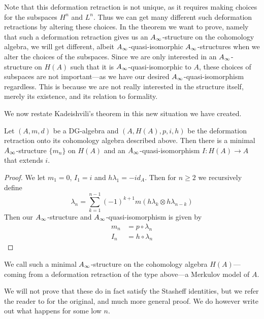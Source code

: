 Note that this deformation retraction is not unique, as it requires making choices for the subspaces $H^n$ and $L^n$. Thus we can get many different such deformation retractions by altering these choices. In the theorem we want to prove, namely that such a deformation retraction gives us an $A_{\infty}$-structure on the cohomology algebra, we will get different, albeit $A_{\infty}$-quasi-isomorphic $A_{\infty}$-structures when we alter the choices of the subspaces. Since we are only interested in an $A_{\infty}$-structure on $H(A)$ such that it is $A_{\infty}$-quasi-isomorphic to $A$, these choices of subspaces are not important---as we have our desired $A_{\infty}$-quasi-isomorphism regardless. This is because we are not really interested in the structure itself, merely its existence, and its relation to formality. 

We now restate Kadeishvili's theorem in this new situation we have created.

\begin{theorem}
\label{thm:Kadeishvilis_theorem2}
Let $(A, m, d)$ be a DG-algebra and $(A, H(A), p, i, h)$ be the deformation retraction onto its cohomology algebra described above. Then there is a minimal $A_{\infty}$-structure $\{m_n\}$ on $H(A)$ and an $A_{\infty}$-quasi-isomorphism $I\colon H(A)\longrightarrow A$ that extends $i$. 
\end{theorem}
\begin{proof}
We let $m_1=0$, $I_1=i$ and $h\lambda_1 = -id_A$. Then for $n\geq 2$ we recursively define
\begin{equation*}
    \lambda_n = \sum_{k=1}^{n-1}(-1)^{k+1}m(h\lambda_k\otimes h\lambda_{n-k})
\end{equation*}
Then our $A_{\infty}$-structure and $A_{\infty}$-quasi-isomorphism is given by 
\begin{align*}
    m_n &= p\circ \lambda_n \\
    I_n &= h\circ \lambda_n
\end{align*}
\end{proof}

We call such a minimal $A_{\infty}$-structure on the cohomology algebra $H(A)$---coming from a deformation retraction of the type above---a Merkulov model of $A$. 

We will not prove that these do in fact satisfy the Stasheff identities, but we refer the reader to \cite{kadeishvili} for the original, and much more general proof. We do however write out what happens for some low $n$. 


